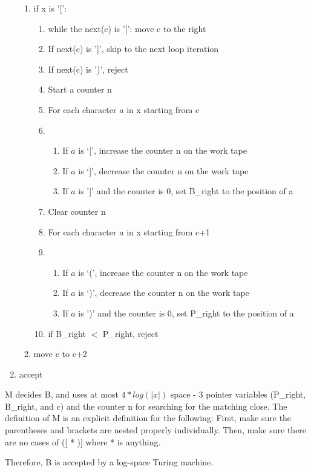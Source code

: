\documentclass{article}
\begin{document}
\begin{enumerate}[label=]
\begin{enumerate}[label=]
\item if x is '[': 
\begin{enumerate}[label=]
\item while the next(c) is '[': move c to the right
\item If next(c) is ']', skip to the next loop iteration
\item If next(c) is ')', reject
\item Start a counter n
\item For each character $a$ in x starting from c
\item \begin{enumerate}[label=]
\item If $a$ is `[', increase the counter n on the work tape
\item If $a$ is `]', decrease the counter n on the work tape
\item If $a$ is ']' and the counter is 0, set B\_right to the position of a
\end{enumerate}
\item Clear counter n
\item For each character $a$ in x starting from c+1
\item \begin{enumerate}[label=]
\item If $a$ is `(', increase the counter n on the work tape
\item If $a$ is `)', decrease the counter n on the work tape
\item If $a$ is ')' and the counter is 0, set P\_right to the position of a
\end{enumerate}
\item if B\_right $<$ P\_right, reject
\end{enumerate}
\item move c to c+2
\end{enumerate}
\item accept
\end{enumerate}

M decides B, and uses at most $4*log(|x|)$ space - 3 pointer variables (P\_right, B\_right, and c) and the counter n for searching for the matching close.  The definition of M is an explicit definition for the following: First, make sure the parentheses and brackets are nested properly individually.  Then, make sure there are no cases of ([ * )] where * is anything.  

Therefore, B is accepted by a log-space Turing machine.
\end{document}

